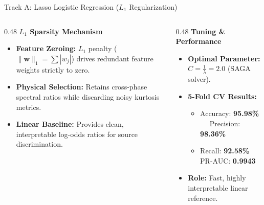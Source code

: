 \documentclass[aspectratio=169,11pt]{beamer}
\begin{document}
\begin{frame}{Track A: Lasso Logistic Regression ($L_1$ Regularization)}
  \vspace*{0.05cm}

  \centering

  \vspace*{0.12cm}
  \begin{columns}[T,onlytextwidth]
    \begin{column}{0.48\textwidth}
      \textbf{\small\color{navy} $L_1$ Sparsity Mechanism}
      \vspace*{0.08cm}
      \begin{itemize}\setlength{\itemsep}{0.25em}\footnotesize
        \item \textbf{Feature Zeroing:} $L_1$ penalty ($\|\mathbf{w}\|_1 = \sum |w_j|$) drives redundant feature weights strictly to zero.
        \item \textbf{Physical Selection:} Retains cross-phase spectral ratios while discarding noisy kurtosis metrics.
        \item \textbf{Linear Baseline:} Provides clean, interpretable log-odds ratios for source discrimination.
      \end{itemize}
    \end{column}
    \hfill
    \begin{column}{0.48\textwidth}
      \textbf{\small\color{blastred} Tuning \& Performance}
      \vspace*{0.08cm}
      \begin{itemize}\setlength{\itemsep}{0.25em}\footnotesize
        \item \textbf{Optimal Parameter:} $C = \frac{1}{\lambda} = 2.0$ (SAGA solver).
        \item \textbf{5-Fold CV Results:}
          \begin{itemize}\scriptsize
            \item Accuracy: \textbf{95.98\%} $\quad$ Precision: \textbf{98.36\%}
            \item Recall: \textbf{92.58\%} $\quad$ PR-AUC: \textbf{0.9943}
          \end{itemize}
        \item \textbf{Role:} Fast, highly interpretable linear reference.
      \end{itemize}
    \end{column}
  \end{columns}
\end{frame}
\end{document}
